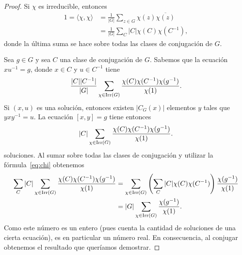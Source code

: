 \begin{proof}
    Si $\chi$ es irreducible, entonces
    \begin{equation}
    \label{eq:chi}
    \begin{aligned}
        1=\langle \chi,\chi\rangle &= \frac{1}{|G|}\sum_{z\in G}\chi(z)\overline{\chi(z)}\\
        &=\frac{1}{|G|}\sum_{C}|C|\chi(C)\chi(C^{-1}),
    \end{aligned}
    \end{equation}
    donde la última suma se hace sobre todas las clases de conjugación de $G$. 

    Sea $g\in G$ y sea $C$ una clase de conjugación de $G$. Sabemos
    que la ecuación $xu^{-1}=g$, donde $x\in C$ y $u\in C^{-1}$ tiene 
    \[
    \frac{|C||C^{-1}|}{|G|}\sum_{\chi\in\operatorname{Irr}(G)}\frac{\chi(C)\chi(C^{-1})\chi(g^{-1})}{\chi(1)}.
    \]
    Si $(x,u)$ es una solución, entonces existen $|C_G(x)|$ elementos $y$ tales que 
    $yxy^{-1}=u$. La ecuación $[x,y]=g$ tiene entonces 
    \[
    |C|\sum_{\chi\in\operatorname{Irr}(G)}\frac{\chi(C)\chi(C^{-1})\chi(g^{-1})}{\chi(1)}.
    \]
    soluciones. Al sumar sobre todas las clases de conjugación y utilizar 
    la fórmula~\eqref{eq:chi} obtenemos
    \begin{align*}
    \sum_C|C|\sum_{\chi\in\operatorname{Irr}(G)}\frac{\chi(C)\chi(C^{-1})\chi(g^{-1})}{\chi(1)}
    &=\sum_{\chi\in\operatorname{Irr}(G)}\left(\sum_C|C|\chi(C)\chi(C^{-1})\right)\frac{\chi(g^{-1})}{\chi(1)}\\
    &=|G|\sum_{\chi\in\operatorname{Irr}(G)}\frac{\chi(g^{-1})}{\chi(1)}.
    \end{align*}
    Como este número es un entero (pues cuenta la cantidad de soluciones de una cierta ecuación), 
    es en particular un número real. En consecuencia, al conjugar obtenemos
    el resultado que queríamos demostrar.
\end{proof}

